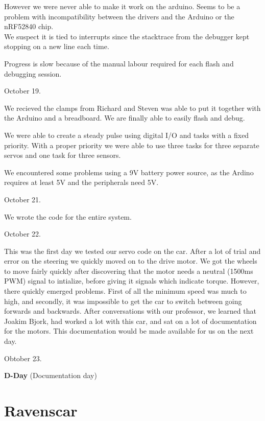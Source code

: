 \documentclass{article}
\begin{document}
However we were never able to make it work on the arduino. Seems to be a problem with incompatibility between the drivers and the Arduino or the nRF52840 chip.\\
We suspect it is tied to interrupts since the stacktrace from the debugger kept stopping on a new line each time.

Progress is slow because of the manual labour required for each flash and debugging session.
\vspace{5mm}

October 19. 

We recieved the clamps from Richard and Steven was able to put it together with the Arduino and a breadboard. We are finally able to easily flash and debug.

We were able to create a steady pulse using digital I/O and tasks with a fixed priority. With a proper priority we were able to use three tasks for three separate servos and one task for three sensors.

We encountered some problems using a 9V battery power source, as the Ardino requires at least 5V and the peripherals need 5V.


\vspace{5mm}
October 21.

We wrote the code for the entire system.


\vspace{5mm}
October 22.

This was the first day we tested our servo code on the car. After a lot of trial and error on the steering we quickly moved on to the drive motor. We got the wheels to move fairly quickly after discovering that the motor needs a neutral (1500ms PWM) signal to intialize, before giving it signals which indicate torque. However, there quickly emerged problems. First of all the minimum speed was much to high, and secondly, it was impossible to get the car to switch between going forwards and backwards. After conversations with our professor, we learned that Joakim Bjork, had worked a lot with this car, and sat on a lot of documentation for the motors. This documentation would be made available for us on the next day.

\vspace{5mm}

Obtober 23.

\textbf{D-Day} (Documentation day)

\section{Ravenscar}
\end{document}
